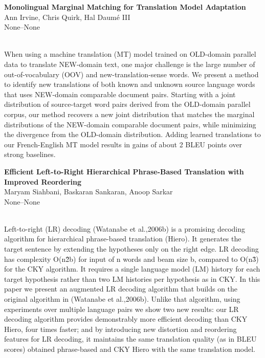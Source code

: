 \documentclass[twoside,makeidx]{book}
\begin{document}
\par\vspace{2em}\noindent%
\begin{minipage}{\linewidth}%
\begin{center}
\textbf{\normalsize Monolingual Marginal Matching for Translation Model Adaptation}\\
\normalsize  Ann Irvine,  Chris Quirk,  Hal Daum\'{e} III\\
{\small None--None}\\
\end{center}
\end{minipage}\\[0.5em]
\nopagebreak%
\noindent%
{\small When using a machine translation (MT) model trained on OLD-domain parallel data to translate NEW-domain text, one major challenge is the large number of out-of-vocabulary (OOV) and new-translation-sense words. We present a method to identify new translations of both known and unknown source language words that uses NEW-domain comparable document pairs. Starting with a joint distribution of source-target word pairs derived from the OLD-domain parallel corpus, our method recovers a new joint distribution that matches the marginal distributions of the NEW-domain comparable document pairs, while minimizing the divergence from the OLD-domain distribution. Adding learned translations to our French-English MT model results in gains of about 2 BLEU points over strong baselines.}
\par\vspace{2em}\noindent%
\begin{minipage}{\linewidth}%
\begin{center}
\textbf{\normalsize Efficient Left-to-Right Hierarchical Phrase-Based Translation with Improved Reordering}\\
\normalsize  Maryam Siahbani,  Baskaran Sankaran,  Anoop Sarkar\\
{\small None--None}\\
\end{center}
\end{minipage}\\[0.5em]
\nopagebreak%
\noindent%
{\small Left-to-right (LR) decoding (Watanabe et al.,2006b) is a promising decoding algorithm for hierarchical phrase-based translation (Hiero). It generates the target sentence by extending the hypotheses only on the right edge. LR decoding has complexity O(n\^2b) for input of n words and beam size b, compared to O(n\^3) for the CKY algorithm. It requires a single language model (LM) history for each target hypothesis rather than two LM histories per hypothesis as in CKY. In this paper we present an augmented LR decoding algorithm that builds on the original algorithm in (Watanabe et al.,2006b). Unlike that algorithm, using experiments over multiple language pairs we show two new results: our LR decoding algorithm provides demonstrably more efficient decoding than CKY Hiero, four times faster; and by introducing new distortion and reordering features for LR decoding, it maintains the same translation quality (as in BLEU scores) obtained phrase-based and CKY Hiero with the same translation model.}
\end{document}
